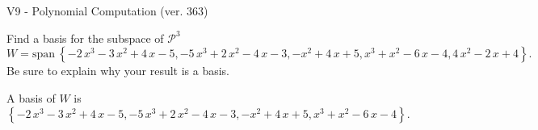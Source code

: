 \begin{exercise}
  \begin{exerciseTitle}V9 - Polynomial Computation (ver. 363)\end{exerciseTitle}
  \begin{exerciseStatement}
    Find a basis for the subspace of \(\mathcal{P}^3\) 
\[W=\mathrm{span}\ \left\{-2 \, x^{3} - 3 \, x^{2} + 4 \, x - 5 , -5 \, x^{3} + 2 \, x^{2} - 4 \, x - 3 , -x^{2} + 4 \, x + 5 , x^{3} + x^{2} - 6 \, x - 4 , 4 \, x^{2} - 2 \, x + 4\right\}.\]
 Be sure to explain why your result is a basis.


  \end{exerciseStatement}
  \begin{exerciseAnswer}
   A basis of \(W\) is  \(\left\{-2 \, x^{3} - 3 \, x^{2} + 4 \, x - 5 , -5 \, x^{3} + 2 \, x^{2} - 4 \, x - 3 , -x^{2} + 4 \, x + 5 , x^{3} + x^{2} - 6 \, x - 4\right\}\).
  


  \end{exerciseAnswer}
\end{exercise}